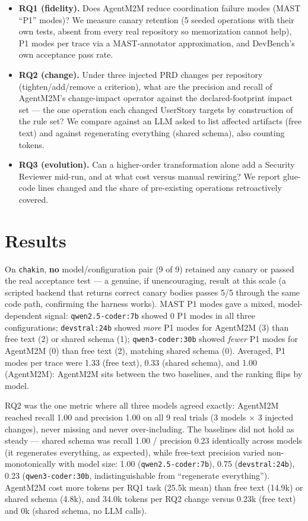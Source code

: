\documentclass[11pt]{article}
\newcommand{\tool}{AgentM2M}
\begin{document}
\begin{itemize}
\item \textbf{RQ1 (fidelity).} Does \tool{} reduce coordination failure
modes (MAST ``P1'' modes)? We measure canary retention (5 seeded
operations with their own tests, absent from every real repository so
memorization cannot help), P1 modes per trace via a MAST-annotator
approximation, and DevBench's own acceptance pass rate.
\item \textbf{RQ2 (change).} Under three injected PRD changes per
repository (tighten/add/remove a criterion), what are the precision and
recall of \tool{}'s change-impact operator against the declared-footprint
impact set --- the one operation each changed UserStory targets by
construction of the rule set? We compare against an LLM asked to list
affected artifacts (free text) and against regenerating everything
(shared schema), also counting tokens.
\item \textbf{RQ3 (evolution).} Can a higher-order transformation alone
add a Security Reviewer mid-run, and at what cost versus manual
rewiring? We report glue-code lines changed and the share of
pre-existing operations retroactively covered.
\end{itemize}

\section*{Results}

On \texttt{chakin}, \textbf{no} model/configuration pair (9 of 9) retained
any canary or passed the real acceptance test --- a genuine, if
unencouraging, result at this scale (a scripted backend that returns
correct canary bodies passes 5/5 through the same code path, confirming
the harness works). MAST P1 modes gave a mixed, model-dependent signal:
\texttt{qwen2.5-coder:7b} showed 0 P1 modes in all three configurations;
\texttt{devstral:24b} showed \emph{more} P1 modes for \tool{} (3) than
free text (2) or shared schema (1); \texttt{qwen3-coder:30b} showed
\emph{fewer} P1 modes for \tool{} (0) than free text (2), matching shared
schema (0). Averaged, P1 modes per trace were 1.33 (free text), 0.33
(shared schema), and 1.00 (\tool{}): \tool{} sits between the two
baselines, and the ranking flips by model.

RQ2 was the one metric where all three models agreed exactly: \tool{}
reached recall 1.00 and precision 1.00 on all 9 real trials (3 models
$\times$ 3 injected changes), never missing and never over-including. The
baselines did not hold as steady --- shared schema was recall 1.00 /
precision 0.23 identically across models (it regenerates everything, as
expected), while free-text precision varied non-monotonically with model
size: 1.00 (\texttt{qwen2.5-coder:7b}), 0.75 (\texttt{devstral:24b}), 0.23
(\texttt{qwen3-coder:30b}, indistinguishable from ``regenerate
everything''). \tool{} cost more tokens per RQ1 task (25.5k mean) than
free text (14.9k) or shared schema (4.8k), and 34.0k tokens per RQ2
change versus 0.23k (free text) and 0k (shared schema, no LLM calls).
\end{document}
